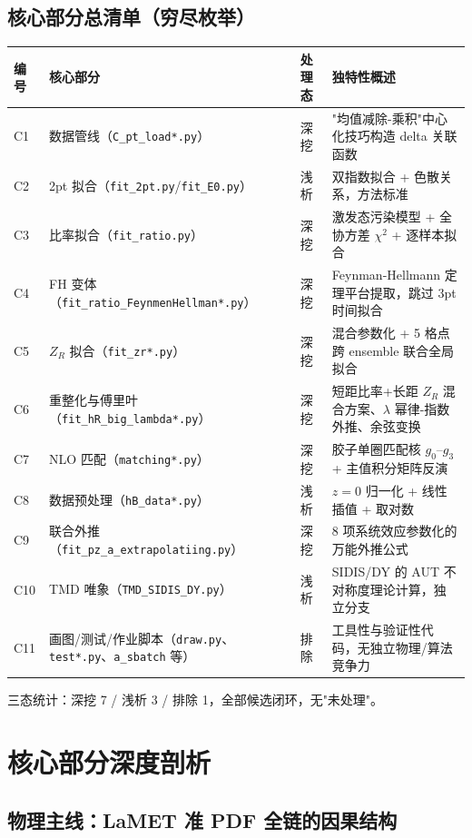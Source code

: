 \documentclass[UTF8]{ctexart}
\begin{document}
\subsection{核心部分总清单（穷尽枚举）}

\begin{xltabular}{\textwidth}{lllX}
\toprule
\textcolor{algo}{编号} & 核心部分 & 处理态 & 独特性概述 \\
\midrule
\endhead
C1 & 数据管线（\texttt{C\_pt\_load*.py}） & 深挖 & "均值减除-乘积"中心化技巧构造 delta 关联函数 \\
C2 & 2pt 拟合（\texttt{fit\_2pt.py}/\texttt{fit\_E0.py}） & 浅析 & 双指数拟合 + 色散关系，方法标准 \\
C3 & 比率拟合（\texttt{fit\_ratio.py}） & 深挖 & 激发态污染模型 + 全协方差 $\chi^2$ + 逐样本拟合 \\
C4 & FH 变体（\texttt{fit\_ratio\_FeynmenHellman*.py}） & 深挖 & Feynman-Hellmann 定理平台提取，跳过 3pt 时间拟合 \\
C5 & $Z_R$ 拟合（\texttt{fit\_zr*.py}） & 深挖 & 混合参数化 + 5 格点跨 ensemble 联合全局拟合 \\
C6 & 重整化与傅里叶（\texttt{fit\_hR\_big\_lambda*.py}） & 深挖 & 短距比率+长距 $Z_R$ 混合方案、$\lambda$ 幂律-指数外推、余弦变换 \\
C7 & NLO 匹配（\texttt{matching*.py}） & 深挖 & 胶子单圈匹配核 $g_0$--$g_3$ + 主值积分矩阵反演 \\
C8 & 数据预处理（\texttt{hB\_data*.py}） & 浅析 & $z=0$ 归一化 + 线性插值 + 取对数 \\
C9 & 联合外推（\texttt{fit\_pz\_a\_extrapolatiing.py}） & 深挖 & 8 项系统效应参数化的万能外推公式 \\
C10 & TMD 唯象（\texttt{TMD\_SIDIS\_DY.py}） & 浅析 & SIDIS/DY 的 AUT 不对称度理论计算，独立分支 \\
C11 & 画图/测试/作业脚本（\texttt{draw.py}、\texttt{test*.py}、\texttt{a\_sbatch} 等） & 排除 & 工具性与验证性代码，无独立物理/算法竞争力 \\
\bottomrule
\end{xltabular}

三态统计：深挖 7 / 浅析 3 / 排除 1，全部候选闭环，无"未处理"。

\section{核心部分深度剖析}

\subsection{物理主线：LaMET 准 PDF 全链的因果结构}
\end{document}
